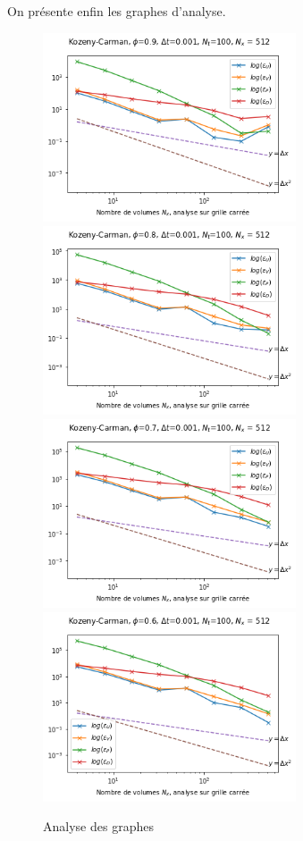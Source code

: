 On présente enfin les graphes d'analyse.
\begin{figure}[htp]
    \centering
    \includegraphics[width=7.5cm]{Images/bicouche/0.9/Figure 2021-11-18 231238 (60).png}
    \includegraphics[width=7.5cm]{Images/bicouche/0.8/Figure 2021-11-18 231238 (52).png}
    \includegraphics[width=7.5cm]{Images/bicouche/0.7/Figure 2021-11-18 231238 (44).png}
    \includegraphics[width=7.5cm]{Images/bicouche/0.6/Figure 2021-11-18 231238 (36).png}
    \caption{Analyse des graphes}
\end{figure}

